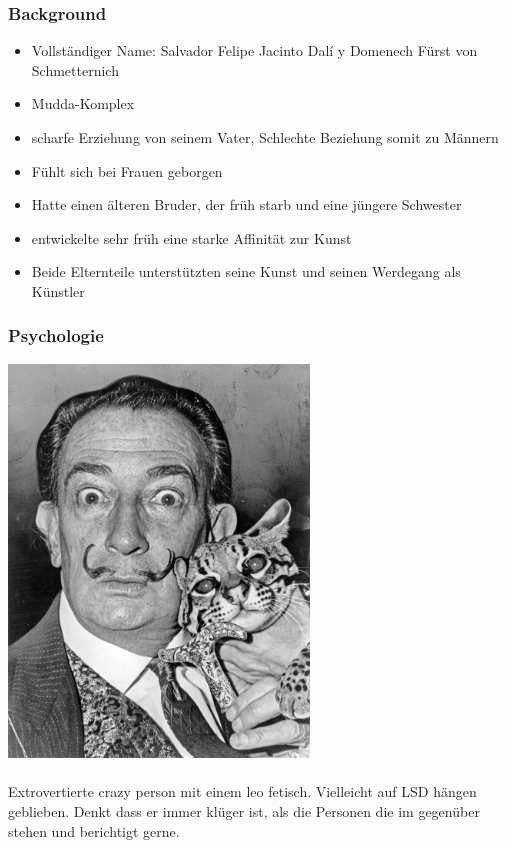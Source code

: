 \documentclass[12pt, a4paper, openany]{report}
\begin{document}
\subsubsection{Background}
\begin{itemize}
\item Vollständiger Name: Salvador Felipe Jacinto Dalí y Domenech Fürst von Schmetternich
\item Mudda-Komplex
\item scharfe Erziehung von seinem Vater, Schlechte Beziehung somit zu Männern
\item Fühlt sich bei Frauen geborgen 
\item Hatte einen älteren Bruder, der früh starb und eine jüngere Schwester
\item entwickelte sehr früh eine starke Affinität zur Kunst
\item Beide Elternteile unterstützten seine Kunst und seinen Werdegang als Künstler
\end{itemize}

\subsubsection{Psychologie}
\includegraphics[width=8cm]{Salvador-Dali.jpg}\\\\
Extrovertierte crazy person mit einem leo fetisch.  Vielleicht auf LSD hängen geblieben. Denkt dass er immer klüger ist, als die Personen die im gegenüber stehen und berichtigt gerne.
\end{document}
